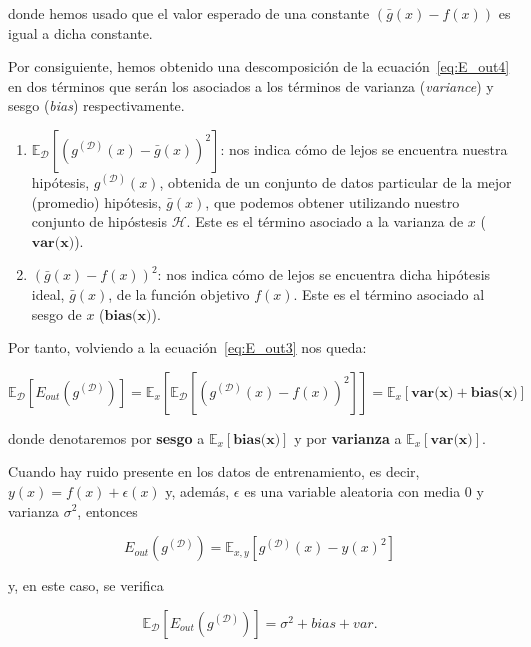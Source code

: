 donde hemos usado que el valor esperado de una constante $(\bar{g}(x) - f(x))$ es igual a dicha constante.\newline

Por consiguiente, hemos obtenido una descomposición de la ecuación~\eqref{eq:E_out4} en dos términos que serán los asociados a los términos de varianza (\textit{variance}) y sesgo (\textit{bias}) respectivamente.

\begin{enumerate}
    \item $\mathbb{E}_{\mathcal{D}}[{(g^{\mathcal{(D)}}(x) - \bar{g}(x))}^2]$: nos indica cómo de lejos se encuentra nuestra hipótesis, $g^{\mathcal{(D)}}(x)$, obtenida de un conjunto de datos particular de la mejor (promedio) hipótesis, $\bar{g}(x)$, que podemos obtener utilizando nuestro conjunto de hipóstesis $\mathcal{H}$. Este es el término asociado a la varianza de $x$ ($\textbf{var(x)}$).
    \item ${(\bar{g}(x) - f(x))}^2$: nos indica cómo de lejos se encuentra dicha hipótesis ideal, $\bar{g}(x)$, de la función objetivo $f(x)$. Este es el término asociado al sesgo de $x$ ($\textbf{bias(x)}$).\newline
\end{enumerate}

Por tanto, volviendo a la ecuación~\eqref{eq:E_out3} nos queda:

\begin{equation}\label{eq:E_out8}
    \mathbb{E}_{\mathcal{D}}[E_{out}(g^{\mathcal{(D)}})] = \mathbb{E}_{x}[\mathbb{E}_{\mathcal{D}}[{(g^{\mathcal{(D)}}(x) - f(x))}^2]] = \mathbb{E}_{x}[\textbf{var(x)} + \textbf{bias(x)}]
\end{equation}

donde denotaremos por \textbf{sesgo} a $\mathbb{E}_{x}[\textbf{bias(x)}]$ y por \textbf{varianza} a $\mathbb{E}_{x}[\textbf{var(x)}]$.\newline

\begin{observacion}
    Cuando hay ruido presente en los datos de entrenamiento, es decir, $y(x) = f(x) + \epsilon(x)$ y, además, $\epsilon$ es una variable aleatoria con media $0$ y varianza $\sigma^{2}$, entonces

    \[ E_{out}(g^{(\mathcal{D})}) = \mathbb{E}_{x, y}[g^{(\mathcal{D})}(x)-{y(x)}^{2}] \]

    y, en este caso, se verifica

    \[ \mathbb{E}_{\mathcal{D}}[E_{out}(g^{(\mathcal{D})})] = \sigma^{2} + bias + var. \]
\end{observacion}

